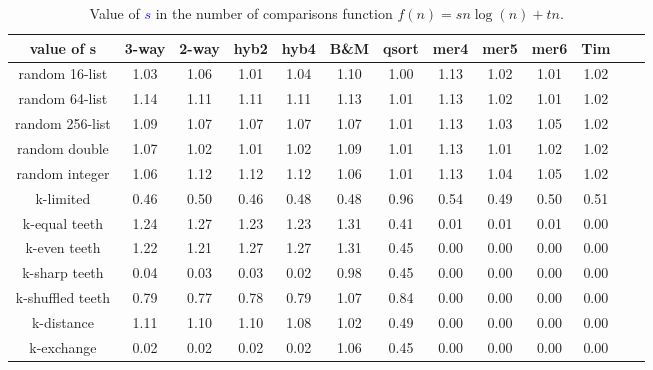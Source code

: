 \documentclass[AMA,STIX1COL]{WileyNJD-v2}
\begin{document}
\begin{table}
\caption{Value of \textcolor{blue}{$s$} in the number of comparisons function $f(n) = sn\log(n) + tn$.}
\centering
\begin{tabular}{|c|c|c|c|c|c|c|c|c|c|c|c|c|}
\toprule
value of s & 3-way & 2-way & hyb2 & hyb4 & B\&M& qsort & mer4 & mer5 & mer6 & Tim \\
\midrule
random 16-list	&1.03&	1.06&	1.01&	1.04&	1.10&	1.00&	1.13&	1.02&	1.01&	1.02\\
random 64-list&1.14	&1.11	&1.11	&1.11	&1.13	&1.01	&1.13	&1.02	&1.01	&1.02\\
random 256-list&	1.09&	1.07&	1.07&	1.07&	1.07&	1.01&	1.13&	1.03&	1.05&	1.02\\
random double&	1.07	&1.02	&1.01	&1.02	&1.09	&1.01	&1.13	&1.01	&1.02	&1.02\\
random integer&	1.06	&1.12&	1.12&	1.12&	1.06&	1.01&	1.13&	1.04&	1.05&	1.02\\
k-limited&	0.46	&0.50	&0.46	&0.48	&0.48	&0.96	&0.54	&0.49	&0.50	&0.51\\
k-equal teeth&	1.24&	1.27&	1.23&	1.23&	1.31&	0.41&	0.01&	0.01&	0.01&	0.00\\
k-even teeth&	1.22	&1.21	&1.27	&1.27	&1.31	&0.45	&0.00	&0.00	&0.00	&0.00\\
k-sharp teeth&	0.04	&0.03&	0.03&	0.02&	0.98&	0.45&	0.00&	0.00	&0.00	&0.00\\
k-shuffled teeth&	0.79	&0.77	&0.78	&0.79	&1.07	&0.84	&0.00	&0.00	&0.00	&0.00\\
k-distance&	1.11	&1.10&	1.10&	1.08&	1.02&	0.49&	0.00&	0.00&	0.00&	0.00\\
k-exchange&	0.02	&0.02	&0.02	&0.02	&1.06	&0.45	&0.00	&0.00	&0.00	&0.00\\
\bottomrule
\end{tabular}
\label{table5}
\end{table}
\end{document}
